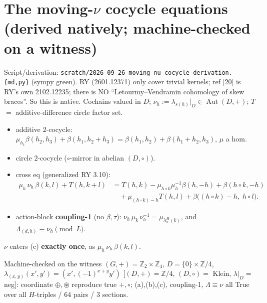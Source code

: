 \documentclass[11pt]{article}
\newcommand{\Aut}{\operatorname{Aut}}
\newcommand{\Z}{\mathbb{Z}}
\begin{document}
\section{The moving-$\nu$ cocycle equations (derived natively; machine-checked on a witness)}
Script/derivation: \texttt{scratch/2026-09-26-moving-nu-cocycle-derivation.\{md,py\}} (sympy green).
RY (2601.12371) only cover trivial kernels; ref [20] is RY's own 2102.12235; there is NO
``Letourmy--Vendramin cohomology of skew braces''. So this is native. Cochains valued in $D$;
$\nu_h := \lambda_{s(h)}|_D\in\Aut(D,+)$; $T$ $=$ additive-difference circle factor set.
\begin{itemize}
  \item[\textbf{(a)}] additive $2$-cocycle:
    $\mu_{h_1}\beta(h_2,h_3)+\beta(h_1,h_2+h_3)=\beta(h_1,h_2)+\beta(h_1+h_2,h_3)$, $\mu$ a hom.
  \item[\textbf{(b)}] circle $2$-cocycle ($\circ$-mirror in abelian $(D,\circ)$).
  \item[\textbf{(c)}] cross eq (generalized RY 3.10):
  \begin{align*}
    \mu_h\,\nu_h\,\beta(k,l) + T(h,k+l)
      &= T(h,k) - \mu_{h\circ k}\mu_h^{-1}\beta(h,-h) + \beta(h\circ k,-h)\\
      &\quad{}+ \mu_{(h\circ k)-h}T(h,l) + \beta\big((h\circ k)-h,\; h\circ l\big).
  \end{align*}
  \item action-block \textbf{coupling-1} (no $\beta,\tau$):
    $\nu_h\,\mu_k\,\nu_h^{-1}=\mu_{\lambda^H_h(k)}$, and $\Lambda_{(d,h)}\equiv\nu_h\pmod L$.
\end{itemize}
$\nu$ enters (c) \textbf{exactly once}, as $\mu_h\,\nu_h\,\beta(k,l)$.

\medskip\noindent Machine-checked on the witness $(G,+)=\Z_2\times\Z_4$, $D=\{0\}\times\Z/4$,
$\lambda_{(x,y)}(x',y')=(x',(-1)^{x+y}y')$ [$(D,+)=\Z/4$, $(D,\circ)=$ Klein, $\lambda|_D=$ neg]:
coordinate $\oplus,\circledast$ reproduce true $+,\circ$; (a),(b),(c), coupling-1,
$\Lambda\equiv\nu$ all True over all $H$-triples / $64$ pairs / $3$ sections.
\end{document}
